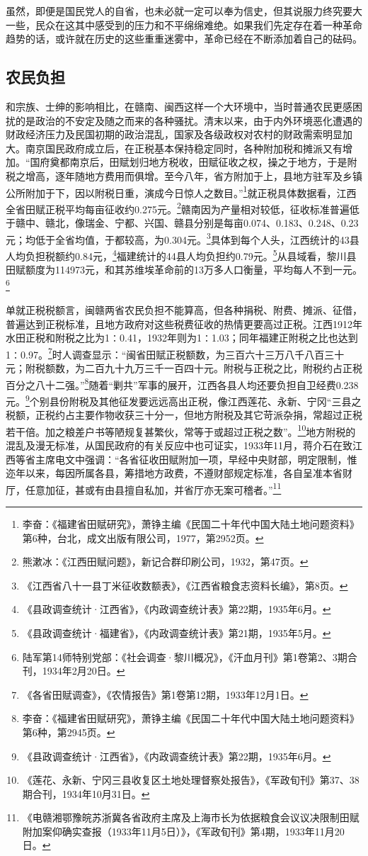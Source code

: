 虽然，即便是国民党人的自省，也未必就一定可以奉为信史，但其说服力终究要大一些，民众在这其中感受到的压力和不平绵绵难绝。如果我们先定存在着一种革命趋势的话，或许就在历史的这些重重迷雾中，革命已经在不断添加着自己的砝码。

\subsection{农民负担}


和宗族、士绅的影响相比，在赣南、闽西这样一个大环境中，当时普通农民更感困扰的是政治的不安定及随之而来的各种骚扰。清末以来，由于内外环境恶化遭遇的财政经济压力及民国初期的政治混乱，国家及各级政权对农村的财政需索明显加大。南京国民政府成立后，在正税基本保持稳定同时，各种附加税和摊派又有增加。“国府奠都南京后，田赋划归地方税收，田赋征收之权，操之于地方，于是附税之增高，逐年随地方费用而俱增。至今八年，省方附加于上，县地方驻军及乡镇公所附加于下，因以附税日重，演成今日惊人之数目。”\footnote{李奋：《福建省田赋研究》，萧铮主编《民国二十年代中国大陆土地问题资料》第6种，台北，成文出版有限公司，1977，第2952页。}就正税具体数据看，江西全省田赋正税平均每亩征收约0.275元。\footnote{熊漱冰：《江西田赋问题》，新记合群印刷公司，1932，第47页。}赣南因为产量相对较低，征收标准普遍低于赣中、赣北，像瑞金、宁都、兴国、赣县分别是每亩0.074、0.183、0.248、0.23元；均低于全省均值，于都较高，为0.304元。\footnote{《江西省八十一县丁米征收数额表》，《江西省粮食志资料长编》，第8页。}具体到每个人头，江西统计的43县人均负担税额约0.84元，\footnote{《县政调查统计·江西省》，《内政调查统计表》第22期，1935年6月。}福建统计的44县人均负担约0.79元。\footnote{《县政调查统计·福建省》，《内政调查统计表》第21期，1935年5月。}从县域看，黎川县田赋额度为114973元，和其苏维埃革命前的13万多人口衡量，平均每人不到一元。\footnote{陆军第14师特别党部：《社会调查·黎川概况》，《汗血月刊》第1卷第2、3期合刊，1934年2月20日。}


单就正税税额言，闽赣两省农民负担不能算高，但各种捐税、附费、摊派、征借，普遍达到正税标准，且地方政府对这些税费征收的热情更要高过正税。江西1912年水田正税和附税之比为1∶0.41，1932年则为1∶1.03；同年福建正附税之比也达到1∶0.97。\footnote{《各省田赋调查》，《农情报告》第1卷第12期，1933年12月1日。}时人调查显示：“闽省田赋正税额数，为三百六十三万八千八百三十元；附税额数，为二百九十九万三千一百四十元。附税与正税之比，附税约占正税百分之八十二强。”\footnote{李奋：《福建省田赋研究》，萧铮主编《民国二十年代中国大陆土地问题资料》第6种，第2945页。}随着“剿共”军事的展开，江西各县人均还要负担自卫经费0.238元。\footnote{《县政调查统计·江西省》，《内政调查统计表》第22期，1935年6月。}个别县份附税及其他征发要远远高出正税，像江西莲花、永新、宁冈“三县之税额，正税约占主要作物收获三十分一，但地方附税及其它苛派杂捐，常超过正税若干倍。加之粮差户书等陋规复甚繁伙，常等于或超过正税之数”。\footnote{《莲花、永新、宁冈三县收复区土地处理督察处报告》，《军政旬刊》第37、38期合刊，1934年10月31日。}地方附税的混乱及漫无标准，从国民政府的有关反应中也可证实，1933年11月，蒋介石在致江西等省主席电文中强调：“各省征收田赋附加一项，早经中央财部，明定限制，惟迩年以来，每因所属各县，筹措地方政费，不遵财部规定标准，各自呈准本省财厅，任意加征，甚或有由县擅自私加，并省厅亦无案可稽者。”\footnote{《电赣湘鄂豫皖苏浙冀各省政府主席及上海市长为依据粮食会议议决限制田赋附加案仰确实查报（1933年11月5日）》，《军政旬刊》第4期，1933年11月20日。}


